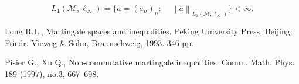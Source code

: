 \documentclass[reqno]{amsart}
\newcommand{\norm}[1]{\left\lVert#1\right\rVert}
\numberwithin{equation}{section}
\begin{document}
$$L_1(\mathcal{M}, \ell_\infty)=\{a=(a_n)_n: \quad \norm{a}_{L_1(\mathcal{M},\ell_\infty)}\}<\infty.$$


\begin{thebibliography}{99}
 Long R.L., Martingale spaces and inequalities. Peking University Press, Beijing; Friedr. Vieweg \& Sohn, Braunschweig, 1993. 346 pp.

 Pisier G., Xu Q., Non-commutative martingale inequalities. Comm. Math. Phys. 189 (1997), no.3, 667--698.




\end{thebibliography}
\end{document}
